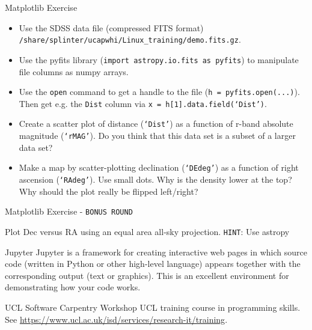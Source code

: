 \documentclass{beamer}
\begin{document}
\begin{frame}{Matplotlib Exercise}

  \begin{itemize}

  \item Use the SDSS data file (compressed FITS format) \texttt{/share/splinter/ucapwhi/Linux\_training/demo.fits.gz}.
  
  \item Use the pyfits library (\texttt{import astropy.io.fits as pyfits}) to manipulate file columns as numpy arrays.
  
  \item Use the \texttt{open} command to get a handle to the file (\texttt{h = pyfits.open(...)}). Then get e.g. the \texttt{Dist} column via \texttt{x = h[1].data.field(`Dist')}.
  
  \item Create a scatter plot of distance (\texttt{`Dist'}) as a function of r-band absolute magnitude (\texttt{`rMAG'}). Do you think that this data set is a subset of a larger data set?
  
  \item Make a map by scatter-plotting declination (\texttt{`DEdeg'}) as a function of right ascension (\texttt{`RAdeg'}). Use small dots. Why is the density lower at the top? Why should the plot really be flipped left/right?
  
  \end{itemize}

\end{frame}


\begin{frame}{Matplotlib Exercise - \texttt{BONUS ROUND}}

    \begin{block}{Plot Dec versus RA using an equal area all-sky projection.}
        \texttt{HINT}: Use astropy
    \end{block}

\end{frame}

\begin{frame}{Jupyter}
  Jupyter is a framework for creating interactive web pages in which source code (written in Python or other high-level language) appears together with the corresponding output (text or graphics). This is an excellent environment for demonstrating how your code works.
\end{frame}

\begin{frame}{UCL Software Carpentry Workshop}
  UCL training course in programming skills. See \url{https://www.ucl.ac.uk/isd/services/research-it/training}.
\end{frame}
\end{document}
